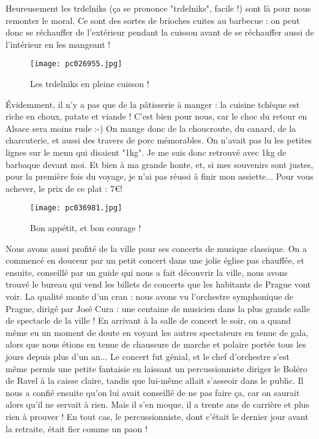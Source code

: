 \documentclass{book}
\begin{document}
Heureusement les trdelniks (ça se prononce "trdelniks", facile !) sont là pour nous remonter le moral. Ce sont des sortes de brioches cuites au barbecue : on peut donc se réchauffer de l'extérieur pendant la cuisson avant de se réchauffer aussi de l'intérieur en les mangeant !


\begin{figure}[h]
\centering
\texttt{[image: pc026955.jpg]}
\caption*{Les trdelniks en pleine cuisson !}
\end{figure}

Évidemment, il n'y a pas que de la pâtisserie à manger : la cuisine tchèque est riche en choux, patate et viande ! C'est bien pour nous, car le choc du retour en Alsace sera moins rude :-) On mange donc de la choucroute, du canard, de la charcuterie, et aussi des travers de porc mémorables. On n'avait pas lu les petites lignes sur le menu qui disaient "1kg". Je me suis donc retrouvé avec 1kg de barbaque devant moi. Et bien à ma grande honte, et, si mes souvenirs sont justes, pour la première fois du voyage, je n'ai pas réussi à finir mon assiette... Pour vous achever, le prix de ce plat : 7\euro !


\begin{figure}[h]
\centering
\texttt{[image: pc036981.jpg]}
\caption*{Bon appétit, et bon courage !}
\end{figure}

Nous avons aussi profité de la ville pour ses concerts de musique classique. On a commencé en douceur par un petit concert dans une jolie église pas chauffée, et ensuite, conseillé par un guide qui nous a fait découvrir la ville, nous avons trouvé le bureau qui vend les billets de concerts que les habitants de Prague vont voir. La qualité monte d'un cran : nous avons vu l'orchestre symphonique de Prague, dirigé par José Cura : une centaine de musicien dans la plus grande salle de spectacle de la ville ! En arrivant à la salle de concert le soir, on a quand même eu un moment de doute en voyant les autres spectateurs en tenue de gala, alors que nous étions en tenue de chaussure de marche et polaire portée tous les jours depuis plus d'un an... Le concert fut génial, et le chef d'orchestre s'est même permis une petite fantaisie en laissant un percussionniste diriger le Boléro de Ravel à la caisse claire, tandis que lui-même allait s'asseoir dans le public. Il nous a confié ensuite qu'on lui avait conseillé de ne pas faire ça, car on saurait alors qu'il ne servait à rien. Mais il s'en moque, il a trente ans de carrière et plus rien à prouver ! En tout cas, le percussionniste, dont c'était le dernier jour avant la retraite, était fier comme un paon !
\end{document}
